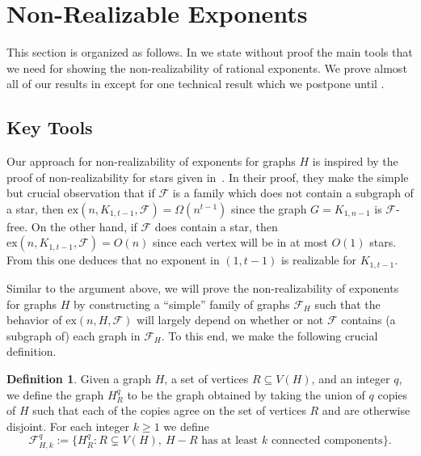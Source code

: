 \documentclass[12pt,letterpaper]{article}
\theoremstyle{definition}
\newtheorem{definition}{Definition}
\newcommand{\pow}{q} %
\newcommand{\ex}{\mathrm{ex}}
\renewcommand{\c}[1]{\mathcal{#1}}
\newcommand{\Om}{\Omega}
\newcommand{\sub}{\subseteq}
\begin{document}
	\section{Non-Realizable Exponents}\label{section non-realizable}
	
	This section is organized as follows.  In  we state without proof the main tools that we need for showing the non-realizability of rational exponents.  We prove almost all of our results in  except for one technical result  which we postpone until .
	
	\subsection{Key Tools}\label{subsection non-realizable tools}
	
	Our approach for non-realizability of exponents for graphs $H$ is inspired by the proof of non-realizability for stars given in~\cite{EHK2025}. In their proof, they make the simple but crucial observation that if $\c{F}$ is a family which does not contain a subgraph of a star, then $\ex(n,K_{1,t-1},\c{F})=\Om(n^{t-1})$ since the graph $G=K_{1,n-1}$ is $\c{F}$-free.  On the other hand, if $\c{F}$ does contain a star, then $\ex(n,K_{1,t-1},\c{F})=O(n)$ since each vertex will be in at most $O(1)$ stars.  From this one deduces that no exponent in $(1,t-1)$ is realizable for $K_{1,t-1}$.
	
	Similar to the argument above, we will prove the non-realizability of exponents for graphs $H$ by constructing a ``simple'' family of graphs $\c{F}_H$ such that the behavior of $\ex(n,H,\c{F})$ will largely depend on whether or not $\c{F}$ contains (a subgraph of) each graph in $\c{F}_H$.   To this end, we make the following crucial definition.
	
	\begin{definition}\label{definition flower powers}
		Given a graph $H$, a set of vertices $R\sub V(H)$, and an integer $\pow$, we define the graph $H_R^\pow$ to be the graph obtained by taking the union of $\pow$ copies of $H$ such that each of the copies agree on the set of vertices $R$ and are otherwise disjoint.  For each integer $k\ge 1$ we define
		\[
		\c{F}_{H,k}^\pow:=\{H_R^\pow: R\subsetneq V(H),\ H-R\textrm{ has at least }k\textrm{ connected components}\}.
		\]
	\end{definition}
	
\end{document}
